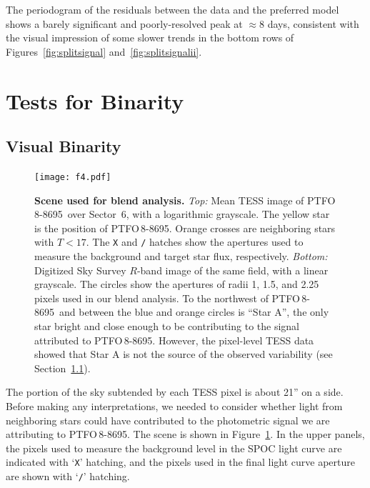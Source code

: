 \documentclass[12pt,twocolumn,tighten,trackchanges]{aastex62}
\newcommand{\ptfo}{PTFO$\,$8-8695}
\begin{document}
The periodogram of the residuals between the data and the preferred
model shows a barely significant and poorly-resolved peak at
$\approx$8 days, consistent with the visual impression of some slower
trends in the bottom rows of Figures~\ref{fig:splitsignal}
and~\ref{fig:splitsignalii}.

\section{Tests for Binarity}
\label{sec:gaia}

\subsection{Visual Binarity}
\label{subsec:blend}

\begin{figure}[t]
	\begin{center}
		\leavevmode
		\texttt{[image: f4.pdf]}
	\end{center}
	\vspace{-0.7cm}
	\caption{ {\bf Scene used for blend analysis.}
    {\it Top:} Mean TESS image of \ptfo\ over Sector~6, with a
    logarithmic grayscale. The yellow star is the position of \ptfo.
    Orange crosses are neighboring stars with $T<17$. The \texttt{X}
    and \texttt{/} hatches show the apertures used to measure the
    background and target star flux, respectively.  {\it Bottom:}
    Digitized Sky Survey $R$-band image of the same field, with a
    linear grayscale. The circles show the apertures of radii 1, 1.5,
    and 2.25 pixels used in our blend analysis. To the northwest of
    \ptfo\ and between the blue and orange circles is ``Star A'', the
    only star bright and close enough to be contributing to the signal
    attributed to \ptfo. However, the pixel-level TESS data showed
    that Star A is not the source of the observed variability (see
    Section~\ref{subsec:blend}).
		\label{fig:scene}
	}
\end{figure}

The portion of the sky subtended by each TESS pixel is about 21'' on a
side. Before making any interpretations, we needed to consider whether
light from neighboring stars could have contributed to the photometric
signal we are attributing to \ptfo. The scene is shown in
Figure~\ref{fig:scene}.  In the upper panels, the pixels used to
measure the background level in the SPOC light curve are indicated
with `\texttt{X}' hatching, and the pixels used in the final light
curve aperture are shown with `\texttt{/}' hatching.
\end{document}
